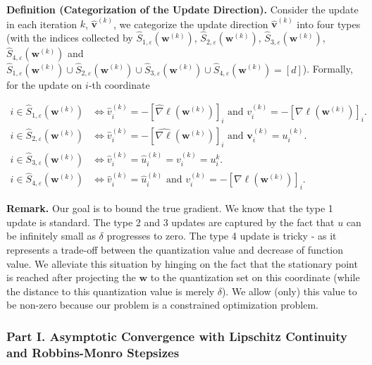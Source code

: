 \documentclass[10pt,a4paper]{article}
\begin{document}
\textbf{Definition (Categorization of the Update Direction).} Consider the update in each iteration $k$, $\hat{\mathbf{v}}^{(k)}$, we categorize the update direction $\hat{\mathbf{v}}^{(k)}$ into four types (with the indices collected by $\hat{S}_{1,\varepsilon}(\mathbf{w}^{(k)})$, $\hat{S}_{2,\varepsilon}(\mathbf{w}^{(k)})$, $\hat{S}_{3,\varepsilon}(\mathbf{w}^{(k)})$, $\hat{S}_{4,\varepsilon}(\mathbf{w}^{(k)})$ and $\hat{S}_{1,\varepsilon}(\mathbf{w}^{(k)})\cup \hat{S}_{2,\varepsilon}(\mathbf{w}^{(k)})\cup \hat{S}_{3,\varepsilon}(\mathbf{w}^{(k)})\cup \hat{S}_{4,\varepsilon}(\mathbf{w}^{(k)})=[d]$). Formally, for the update on $i$-th coordinate 

\begin{align*} i\in \hat{S}_{1,\varepsilon}(\mathbf{w}^{(k)}) &\Longleftrightarrow \hat{v}^{(k)}_i=-[\widehat{\nabla}\ell(\mathbf{w}^{(k)})]_i \text{ and } v^{(k)}_i=-[\nabla\ell(\mathbf{w}^{(k)})]_i.\\
 i\in \hat{S}_{2,\varepsilon}(\mathbf{w}^{(k)}) &\Longleftrightarrow \hat{v}^{(k)}_i=-[\widehat{\nabla\ell}(\mathbf{w}^{(k)})]_i \text{ and } \mathbf{v}^{(k)}_i=u^{(k)}_i.\\
 i\in \hat{S}_{3,\varepsilon}(\mathbf{w}^{(k)}) &\Longleftrightarrow \hat{v}^{(k)}_i=\hat{u}^{(k)}_i =v^{(k)}_i=u^{k}_i.\\
 i\in \hat{S}_{4,\varepsilon}(\mathbf{w}^{(k)}) &\Longleftrightarrow \hat{v}^{(k)}_i=\hat{u}^{(k)}_i \text{ and } v^{(k)}_i=-[\nabla\ell(\mathbf{w}^{(k)})]_i.\end{align*}

\textbf{Remark.} Our goal is to bound the true gradient. We know that the type 1 update is standard. The type 2 and 3 updates are captured by the fact that $u$ can be infinitely small as $\delta$ progresses to zero. The type 4 update is tricky - as it represents a trade-off between the quantization value and decrease of function value. We alleviate this situation by hinging on the fact that the stationary point is reached after projecting the $\mathbf{w}$ to the quantization set on this coordinate (while the distance to this quantization value is merely $\delta$). We allow (only) this value to be non-zero because our problem is a constrained optimization problem.

\subsubsection{Part I. Asymptotic Convergence with Lipschitz Continuity and Robbins-Monro Stepsizes}\hfill\\
\end{document}
